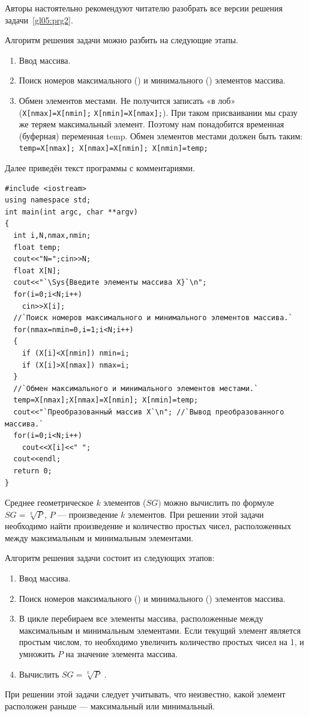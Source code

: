 Авторы настоятельно рекомендуют читателю разобрать все версии решения задачи~\ref{gl05:prg2}.


Алгоритм решения задачи можно разбить на следующие этапы.

\begin{enumerate}
\item Ввод массива.
\item Поиск номеров максимального () и минимального () элементов массива.
\item Обмен элементов местами. Не получится записать «в лоб» (\lstinline!X[nmax]=X[nmin];!
\mbox{\lstinline!X[nmin]=X[nmax];!)}. 
При таком присваивании мы сразу же теряем максимальный элемент. 
Поэтому нам понадобится временная (буферная) переменная temp. Обмен элементов
местами должен быть таким:
\mbox{\lstinline!temp=X[nmax]; X[nmax]=X[nmin]; X[nmin]=temp;!}
\end{enumerate}

Далее приведён текст программы с комментариями.
\begin{lstlisting}
#include <iostream>
using namespace std;
int main(int argc, char **argv)
{
  int i,N,nmax,nmin;
  float temp;
  cout<<"N=";cin>>N;
  float X[N];
  cout<<"`\Sys{Введите элементы массива Х}`\n";
  for(i=0;i<N;i++)
    cin>>X[i];
  //`Поиск номеров максимального и минимального элементов массива.`
  for(nmax=nmin=0,i=1;i<N;i++)
  {
    if (X[i]<X[nmin]) nmin=i;
    if (X[i]>X[nmax]) nmax=i;
  }
  //`Обмен максимального и минимального элементов местами.`
  temp=X[nmax];X[nmax]=X[nmin]; X[nmin]=temp;
  cout<<"`Преобразованный массив Х`\n"; //`Вывод преобразованного массива.`
  for(i=0;i<N;i++)
    cout<<X[i]<<" ";
  cout<<endl;
  return 0;
}
\end{lstlisting}


Среднее геометрическое $k$ элементов ($SG)$ можно вычислить по формуле 
$SG=\sqrt[{k}]{P}$, $P$ --- произведение $k$ элементов. При решении этой задачи
необходимо найти  произведение и количество простых чисел, расположенных между максимальным и минимальным элементами.

Алгоритм решения задачи состоит из следующих этапов:

\begin{enumerate}
\item Ввод массива.
\item Поиск номеров максимального () и минимального () элементов массива.
\item В цикле перебираем все элементы массива, расположенные между максимальным и минимальным элементами. Если текущий
элемент является простым числом, то необходимо увеличить количество простых чисел на 1, и умножить $P$ на значение
элемента массива.
\item Вычислить  $SG=\sqrt[{k}]{P}$ .
\end{enumerate}
При решении этой задачи следует учитывать, что неизвестно, какой элемент расположен раньше --- максимальный или минимальный.

